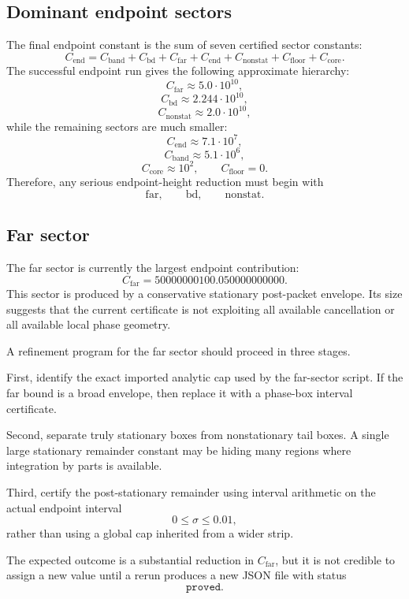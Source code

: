 \documentclass[11pt]{article}
\newcommand{\Cend}{C_{\mathrm{end}}}
\begin{document}
\subsection{Dominant endpoint sectors}

The final endpoint constant is the sum of seven certified sector constants:
\[
\Cend
=
C_{\mathrm{band}}
+
C_{\mathrm{bd}}
+
C_{\mathrm{far}}
+
C_{\mathrm{end}}
+
C_{\mathrm{nonstat}}
+
C_{\mathrm{floor}}
+
C_{\mathrm{core}}.
\]
The successful endpoint run gives the following approximate hierarchy:
\[
C_{\mathrm{far}}\approx 5.0\cdot 10^{10},
\]
\[
C_{\mathrm{bd}}\approx 2.244\cdot 10^{10},
\]
\[
C_{\mathrm{nonstat}}\approx 2.0\cdot 10^{10},
\]
while the remaining sectors are much smaller:
\[
C_{\mathrm{end}}\approx 7.1\cdot 10^7,
\]
\[
C_{\mathrm{band}}\approx 5.1\cdot 10^6,
\]
\[
C_{\mathrm{core}}\approx 10^2,
\qquad
C_{\mathrm{floor}}=0.
\]
Therefore, any serious endpoint-height reduction must begin with
\[
\mathrm{far},
\qquad
\mathrm{bd},
\qquad
\mathrm{nonstat}.
\]

\subsection{Far sector}

The far sector is currently the largest endpoint contribution:
\[
C_{\mathrm{far}}
=
50000000100.050000000000.
\]
This sector is produced by a conservative stationary post-packet envelope.  Its size suggests that the current certificate is not exploiting all available cancellation or all available local phase geometry.

A refinement program for the far sector should proceed in three stages.

First, identify the exact imported analytic cap used by the far-sector script.  If the far bound is a broad envelope, then replace it with a phase-box interval certificate.

Second, separate truly stationary boxes from nonstationary tail boxes.  A single large stationary remainder constant may be hiding many regions where integration by parts is available.

Third, certify the post-stationary remainder using interval arithmetic on the actual endpoint interval
\[
0\leq\sigma\leq0.01,
\]
rather than using a global cap inherited from a wider strip.

The expected outcome is a substantial reduction in \(C_{\mathrm{far}}\), but it is not credible to assign a new value until a rerun produces a new JSON file with status
\[
\texttt{proved}.
\]
\end{document}
